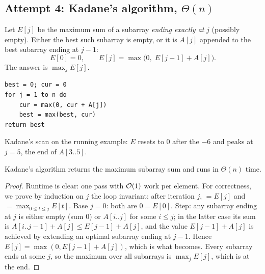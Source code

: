 \subsection{Attempt 4: Kadane's algorithm, \texorpdfstring{$\Theta(n)$}{Theta(n)}}
Let $E[j]$ be the maximum sum of a subarray \emph{ending exactly at} $j$ (possibly empty).
Either the best such subarray is empty, or it is $A[j]$ appended to the best subarray ending at $j-1$:
\[
E[0]=0,\qquad E[j]=\max\bigl(0,\;E[j-1]+A[j]\bigr).
\]
The answer is $\max_j E[j]$.
\begin{lstlisting}[style=pseudo]
best = 0; cur = 0
for j = 1 to n do
    cur = max(0, cur + A[j])
    best = max(best, cur)
return best
\end{lstlisting}

\begin{center}
\end{center}
Kadane's scan on the running example: $E$ resets to $0$ after the $-6$
and peaks at $j=5$, the end of $A[3..5]$.

\begin{theorem}
Kadane's algorithm returns the maximum subarray sum and runs in $\Theta(n)$ time.
\end{theorem}
\begin{proof}
Runtime is clear: one pass with $\mathcal{O}(1)$ work per element.
For correctness, we prove by induction on $j$ the loop invariant: after iteration $j$,
 $=E[j]$ and  $=\max_{0\le t\le j}E[t]$.
Base $j=0$: both are $0=E[0]$. Step: any subarray ending at $j$ is either empty (sum $0$) or
$A[i..j]$ for some $i\le j$; in the latter case its sum is $A[i..j-1]+A[j]\le E[j-1]+A[j]$,
and the value $E[j-1]+A[j]$ is achieved by extending an optimal subarray ending at $j-1$.
Hence $E[j]=\max(0,E[j-1]+A[j])$, which is what  becomes. Every subarray ends at some $j$,
so the maximum over all subarrays is $\max_j E[j]$, which is  at the end.
\end{proof}

